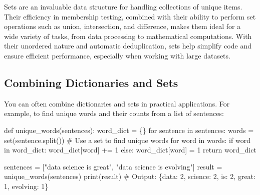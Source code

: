 \documentclass[
  letterpaper,
  DIV=11,
  numbers=noendperiod]{scrreprt}
\newenvironment{Shaded}{\begin{snugshade}}{\end{snugshade}}
\newcommand{\BuiltInTok}[1]{\textcolor[rgb]{0.00,0.23,0.31}{#1}}
\newcommand{\CommentTok}[1]{\textcolor[rgb]{0.37,0.37,0.37}{#1}}
\newcommand{\ControlFlowTok}[1]{\textcolor[rgb]{0.00,0.23,0.31}{#1}}
\newcommand{\DecValTok}[1]{\textcolor[rgb]{0.68,0.00,0.00}{#1}}
\newcommand{\KeywordTok}[1]{\textcolor[rgb]{0.00,0.23,0.31}{#1}}
\newcommand{\NormalTok}[1]{\textcolor[rgb]{0.00,0.23,0.31}{#1}}
\newcommand{\OperatorTok}[1]{\textcolor[rgb]{0.37,0.37,0.37}{#1}}
\newcommand{\StringTok}[1]{\textcolor[rgb]{0.13,0.47,0.30}{#1}}
\begin{document}
Sets are an invaluable data structure for handling collections of unique
items. Their efficiency in membership testing, combined with their
ability to perform set operations such as union, intersection, and
difference, makes them ideal for a wide variety of tasks, from data
processing to mathematical computations. With their unordered nature and
automatic deduplication, sets help simplify code and ensure efficient
performance, especially when working with large datasets.

\hypertarget{combining-dictionaries-and-sets}{%
\subsection{Combining Dictionaries and
Sets}\label{combining-dictionaries-and-sets}}

You can often combine dictionaries and sets in practical applications.
For example, to find unique words and their counts from a list of
sentences:

\begin{Shaded}
\begin{Highlighting}[]
\KeywordTok{def}\NormalTok{ unique\_words(sentences):}
\NormalTok{    word\_dict }\OperatorTok{=}\NormalTok{ \{\}}
    \ControlFlowTok{for}\NormalTok{ sentence }\KeywordTok{in}\NormalTok{ sentences:}
\NormalTok{        words }\OperatorTok{=} \BuiltInTok{set}\NormalTok{(sentence.split())  }\CommentTok{\# Use a set to find unique words}
        \ControlFlowTok{for}\NormalTok{ word }\KeywordTok{in}\NormalTok{ words:}
            \ControlFlowTok{if}\NormalTok{ word }\KeywordTok{in}\NormalTok{ word\_dict:}
\NormalTok{                word\_dict[word] }\OperatorTok{+=} \DecValTok{1}
            \ControlFlowTok{else}\NormalTok{:}
\NormalTok{                word\_dict[word] }\OperatorTok{=} \DecValTok{1}
    \ControlFlowTok{return}\NormalTok{ word\_dict}

\NormalTok{sentences }\OperatorTok{=}\NormalTok{ [}\StringTok{"data science is great"}\NormalTok{, }\StringTok{"data science is evolving"}\NormalTok{]}
\NormalTok{result }\OperatorTok{=}\NormalTok{ unique\_words(sentences)}
\BuiltInTok{print}\NormalTok{(result)  }\CommentTok{\# Output: \{\textquotesingle{}data\textquotesingle{}: 2, \textquotesingle{}science\textquotesingle{}: 2, \textquotesingle{}is\textquotesingle{}: 2, \textquotesingle{}great\textquotesingle{}: 1, \textquotesingle{}evolving\textquotesingle{}: 1\}}
\end{Highlighting}
\end{Shaded}
\end{document}
